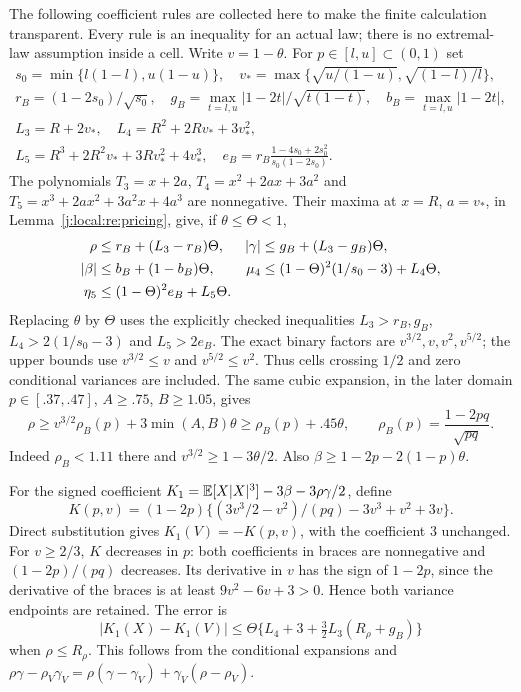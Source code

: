 The following coefficient rules are collected here to make the finite
calculation transparent. Every rule is an inequality for an actual law;
there is no extremal-law assumption inside a cell.
Write $v=1-\theta$. For $p\in[l,u]\subset(0,1)$ set
\begin{gather*}
 s_0=\min\{l(1-l),u(1-u)\},\quad
 v_* =\max\{\sqrt{u/(1-u)},\sqrt{(1-l)/l}\},\\
 r_B=(1-2s_0)/\sqrt{s_0},\quad
 g_B=\max_{t=l,u}|1-2t|/\sqrt{t(1-t)},\quad b_B=\max_{t=l,u}|1-2t|,\\
 L_3=R+2v_*,\quad L_4=R^2+2Rv_*+3v_*^2,\\
 L_5=R^3+2R^2v_*+3Rv_*^2+4v_*^3,\quad
 e_B=r_B\frac{1-4s_0+2s_0^2}{s_0(1-2s_0)}.
\end{gather*}
The polynomials $T_3=x+2a$, $T_4=x^2+2ax+3a^2$ and
$T_5=x^3+2ax^2+3a^2x+4a^3$ are nonnegative. Their maxima at
$x=R$, $a=v_*$, in Lemma~\ref{j:local:re:pricing}, give, if $\theta\le\Theta<1$,
\begin{align}
 \rho&\le r_B+(L_3-r_B)\Theta,&
 |\gamma|&\le g_B+(L_3-g_B)\Theta,\notag\\
 |\beta|&\le b_B+(1-b_B)\Theta,&
 \mu_4&\le(1-\Theta)^2(1/s_0-3)+L_4\Theta,\notag\\
 \eta_5&\le(1-\Theta)^2e_B+L_5\Theta.&&\label{j:local:mom:boxes}
\end{align}
Replacing $\theta$ by $\Theta$ uses the explicitly checked inequalities
$L_3>r_B,g_B$, $L_4>2(1/s_0-3)$ and $L_5>2e_B$.
The exact binary factors are $v^{3/2},v,v^2,v^{5/2}$; the upper bounds
use $v^{3/2}\le v$ and $v^{5/2}\le v^2$. Thus cells crossing $1/2$ and
zero conditional variances are included. The same cubic expansion, in the
later domain $p\in[.37,.47]$, $A\ge.75$, $B\ge1.05$, gives
\begin{equation}\label{j:local:mom:rho-lower}
 \rho\ge v^{3/2}\rho_B(p)+3\min(A,B)\theta
       \ge\rho_B(p)+.45\theta,\qquad
 \rho_B(p)=\frac{1-2pq}{\sqrt{pq}}.
\end{equation}
Indeed $\rho_B<1.11$ there and $v^{3/2}\ge1-3\theta/2$.
Also $\beta\ge1-2p-2(1-p)\theta$.

For the signed coefficient
$K_1=\mathbb E[X|X|^3]-3\beta-3\rho\gamma/2$, define
\[
 K(p,v)=(1-2p)\{(3v^3/2-v^2)/(pq)-3v^3+v^2+3v\}.
\]
Direct substitution gives $K_1(V)=-K(p,v)$, with the coefficient $3$
unchanged. For $v\ge2/3$, $K$ decreases in $p$: both coefficients in
braces are nonnegative and $(1-2p)/(pq)$ decreases. Its derivative in $v$
has the sign of $1-2p$, since the derivative of the braces is at least
$9v^2-6v+3>0$. Hence both variance endpoints are retained. The error is
\begin{equation}\label{j:local:mom:K-error}
 |K_1(X)-K_1(V)|\le
 \Theta\{L_4+3+\tfrac32L_3(R_\rho+g_B)\}
\end{equation}
when $\rho\le R_\rho$. This follows from the conditional expansions and
$\rho\gamma-\rho_V\gamma_V=
\rho(\gamma-\gamma_V)+\gamma_V(\rho-\rho_V)$.

